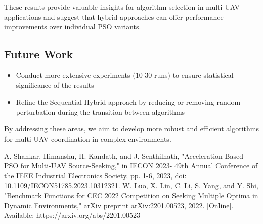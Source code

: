 \documentclass[conference]{IEEEtran}
\begin{document}
These results provide valuable insights for algorithm selection in multi-UAV applications and suggest that hybrid approaches can offer performance improvements over individual PSO variants.

\subsection{Future Work}

\begin{itemize}
    \item Conduct more extensive experiments (10-30 runs) to ensure statistical significance of the results
    \item Refine the Sequential Hybrid approach by reducing or removing random perturbation during the transition between algorithms
\end{itemize}

By addressing these areas, we aim to develop more robust and efficient algorithms for multi-UAV coordination in complex environments.

\begin{thebibliography}{00}
 A. Shankar, Himanshu, H. Kandath, and J. Senthilnath, "Acceleration-Based PSO for Multi-UAV Source-Seeking," in IECON 2023- 49th Annual Conference of the IEEE Industrial Electronics Society, pp. 1-6, 2023, doi: 10.1109/IECON51785.2023.10312321.
 W. Luo, X. Lin, C. Li, S. Yang, and Y. Shi, "Benchmark Functions for CEC 2022 Competition on Seeking Multiple Optima in Dynamic Environments," arXiv preprint arXiv:2201.00523, 2022. [Online]. Available: https://arxiv.org/abs/2201.00523
\end{thebibliography}
\end{document}

